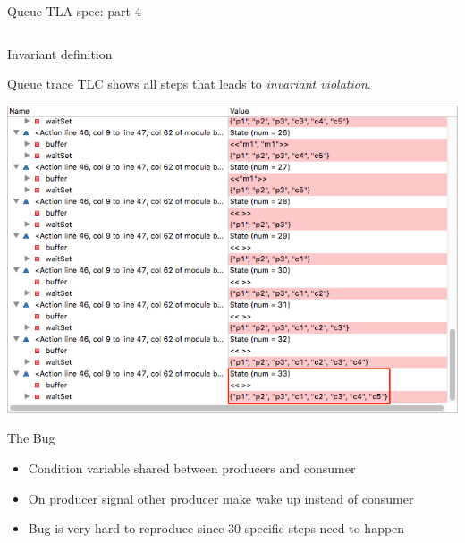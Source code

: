 \documentclass[12pt]{beamer}
\begin{document}
  \begin{frame}{Queue TLA spec: part 4}
      \begin{center}
          \inputminted[firstline=43,lastline=50,linenos,
            fontsize=\scriptsize]{tla}{figures/buffer.tla}
      \end{center}
      Invariant definition
  \end{frame}
  \begin{frame}{Queue trace}
      TLC shows all steps that leads to \textit{invariant violation}.
      \begin{center}
          \includegraphics[scale=0.42]{figures/buffer_trace}
      \end{center}
  \end{frame}
  \begin{frame}{The Bug}
    \begin{itemize}
      \item Condition variable shared between producers and consumer
      \item On producer signal other producer make wake up instead of consumer
      \item Bug is very hard to reproduce since 30 specific steps need to happen
    \end{itemize}
  \end{frame}
\end{document}
